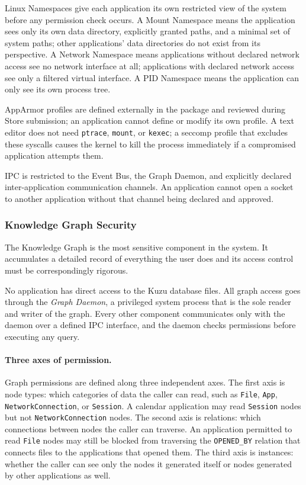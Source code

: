Linux Namespaces give each application its own restricted view of the system
before any permission check occurs. A Mount Namespace means the application
sees only its own data directory, explicitly granted paths, and a minimal set
of system paths; other applications' data directories do not exist from its
perspective. A Network Namespace means applications without declared network
access see no network interface at all; applications with declared network
access see only a filtered virtual interface. A PID Namespace means the
application can only see its own process tree.

AppArmor profiles are defined externally in the package and reviewed during
Store submission; an application cannot define or modify its own profile. A
text editor does not need \texttt{ptrace}, \texttt{mount}, or
\texttt{kexec}; a seccomp profile that excludes these syscalls causes the
kernel to kill the process immediately if a compromised application attempts
them.

IPC is restricted to the Event Bus, the Graph Daemon, and explicitly declared
inter-application communication channels. An application cannot open a socket
to another application without that channel being declared and approved.

\subsubsection{Knowledge Graph Security}
\label{sec:graph-security}

The Knowledge Graph is the most sensitive component in the system. It
accumulates a detailed record of everything the user does and its access
control must be correspondingly rigorous.

No application has direct access to the Kuzu database files. All graph access
goes through the \emph{Graph Daemon}, a privileged system process that is the
sole reader and writer of the graph. Every other component communicates only
with the daemon over a defined IPC interface, and the daemon checks permissions
before executing any query.

\paragraph{Three axes of permission.}
Graph permissions are defined along three independent axes. The first axis is
node types: which categories of data the caller can read, such as
\texttt{File}, \texttt{App}, \texttt{NetworkConnection}, or \texttt{Session}.
A calendar application may read \texttt{Session} nodes but not
\texttt{NetworkConnection} nodes. The second axis is relations: which
connections between nodes the caller can traverse. An application permitted
to read \texttt{File} nodes may still be blocked from traversing the
\texttt{OPENED\_BY} relation that connects files to the applications that
opened them. The third axis is instances: whether the caller can see only the
nodes it generated itself or nodes generated by other applications as well.

